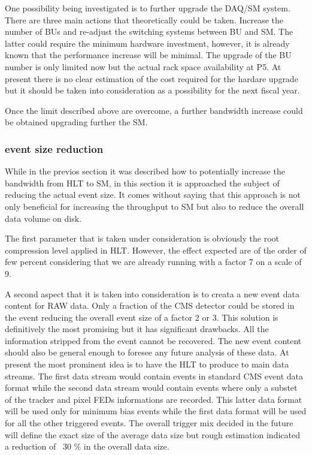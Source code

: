 One possibility being investigated is to further upgrade the DAQ/SM system. There are three main actions that theoretically could be taken. Increase the number of BUs and re-adjust the switching systems between BU and SM. The latter could require the minimum hardware investment, however, it is already known that the performance increase will be minimal. The upgrade of the BU number is only limited now but the actual rack space availability at P5. At present there is no clear estimation of the cost required for the hardare upgrade but it should be taken into consideration as a possibility for the next fiscal year. 

Once the limit described above are overcome, a further bandwidth increase could be obtained upgrading further the SM. 

\subsubsection{event size reduction\label{subsec:hltSMupgrade}}
While in the previos section it was described how to potentially increase the bandwidth from HLT to SM, in this section it is approached the subject of reducing the actual event size. It comes without saying that this approach is not only beneficial for increasing the throughput to SM but also to reduce the overall data volume on disk. 

The first parameter that is taken under consideration is obviously the root compression level applied in HLT. However, the effect expected are of the order of few percent considering that we are already running with a factor 7 on a scale of 9. 

A second aspect that it is taken into consideration is to creata a new event data content for RAW data. Only a fraction of the CMS detector could be stored in the event reducing the overall event size of a factor 2 or 3. This solution is definitively the most promising but it has significant drawbacks. All the information stripped from the event cannot be recovered. The new event content should also be general enough to foresee any future analysis of these data. At present the most prominent idea is to have the HLT to produce to main data streams. The first data stream would contain events in standard CMS event data format while the second data stream would contain events where only a substet of the tracker and pixel FEDs informations are recorded. This latter data format will be used only for minimum bias events while the first data format will be used for all the other triggered events. The overall trigger mix decided in the future will define the exact size of the average data size but rough estimation indicated a reduction of ~30 \% in the overall data size. 

